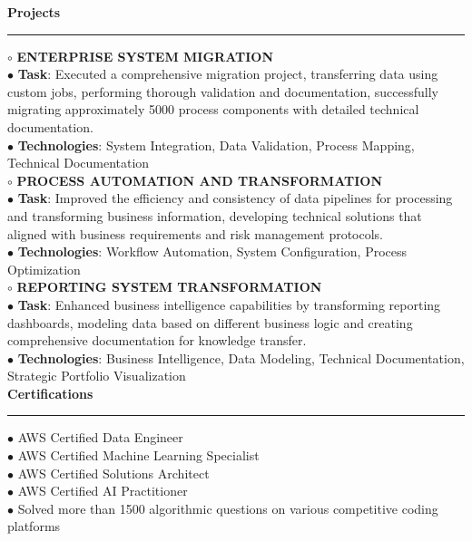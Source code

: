 \documentclass[11pt,a4paper]{article}
\renewcommand{\section}[1]{%
  \vspace{12pt}%
  {\large\bfseries #1}%
  \vspace{6pt}%
  \hrule%
  \vspace{6pt}%
}
\begin{document}
\section{Projects}

\hspace{0.5cm}$\circ$ \textbf{ENTERPRISE SYSTEM MIGRATION}\\[0.1cm]
\noindent $\bullet$ \textbf{Task}: Executed a comprehensive migration project, transferring data using custom jobs, performing thorough validation and documentation, successfully migrating approximately 5000 process components with detailed technical documentation.\\[0.2cm]
\noindent $\bullet$ \textbf{Technologies}: System Integration, Data Validation, Process Mapping, Technical Documentation\\[0.2cm]
\hspace{0.5cm}$\circ$ \textbf{PROCESS AUTOMATION AND TRANSFORMATION}\\[0.1cm]
\noindent $\bullet$ \textbf{Task}: Improved the efficiency and consistency of data pipelines for processing and transforming business information, developing technical solutions that aligned with business requirements and risk management protocols.\\[0.2cm]
\noindent $\bullet$ \textbf{Technologies}: Workflow Automation, System Configuration, Process Optimization\\[0.2cm]
\hspace{0.5cm}$\circ$ \textbf{REPORTING SYSTEM TRANSFORMATION}\\[0.1cm]
\noindent $\bullet$ \textbf{Task}: Enhanced business intelligence capabilities by transforming reporting dashboards, modeling data based on different business logic and creating comprehensive documentation for knowledge transfer.\\[0.2cm]
\noindent $\bullet$ \textbf{Technologies}: Business Intelligence, Data Modeling, Technical Documentation, Strategic Portfolio Visualization\\[0.2cm]
\section{Certifications}

\noindent $\bullet$ AWS Certified Data Engineer\\[0.2cm]
\noindent $\bullet$ AWS Certified Machine Learning Specialist\\[0.2cm]
\noindent $\bullet$ AWS Certified Solutions Architect\\[0.2cm]
\noindent $\bullet$ AWS Certified AI Practitioner\\[0.2cm]
\noindent $\bullet$ Solved more than 1500 algorithmic questions on various competitive coding platforms\\[0.2cm]
\end{document}
